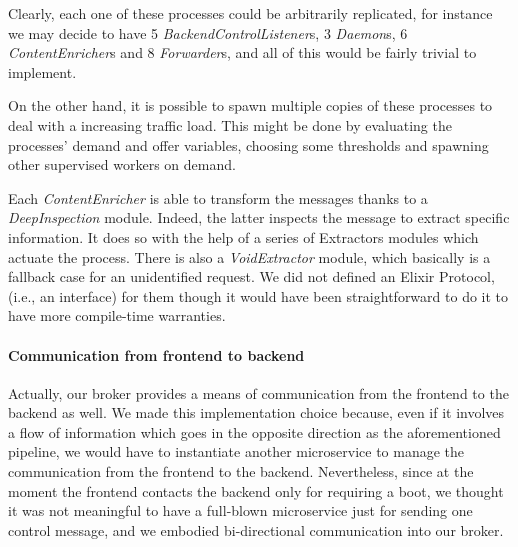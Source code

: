 Clearly, each one of these processes could be arbitrarily replicated, for
instance we may decide to have 5 \textit{BackendControlListener}s, 3
\textit{Daemon}s, 6 \textit{ContentEnricher}s and 8 \textit{Forwarder}s, and
all of this would be fairly trivial to implement.

On the other hand, it is possible to spawn multiple copies of these
processes to deal with a increasing traffic load.
This might be done by evaluating the processes' demand and offer variables,
choosing some thresholds and spawning other supervised workers on demand.

Each \textit{ContentEnricher} is able to transform the  messages thanks to a
\textit{DeepInspection} module. Indeed, the latter inspects the message
to extract specific information.
It does so with the help of a series of Extractors modules which actuate the
process. There is also a \textit{VoidExtractor} module, which basically is a
fallback case for an unidentified request.
We did not defined an Elixir Protocol, (i.e., an interface) for them though it
would have been straightforward to do it to have more compile-time warranties.

\paragraph{Communication from frontend to backend}
Actually, our broker provides a means of communication from the frontend to
the backend as well.
We made this implementation choice because, even if it involves a flow of
information which goes in the opposite direction as the aforementioned
pipeline, we would have to instantiate another microservice to manage the
communication from the frontend to the backend.
Nevertheless, since at the moment the frontend contacts the backend only for
requiring a boot, we thought it was not meaningful to have a full-blown
microservice just for sending one control message, and we embodied
bi-directional communication into our broker.
